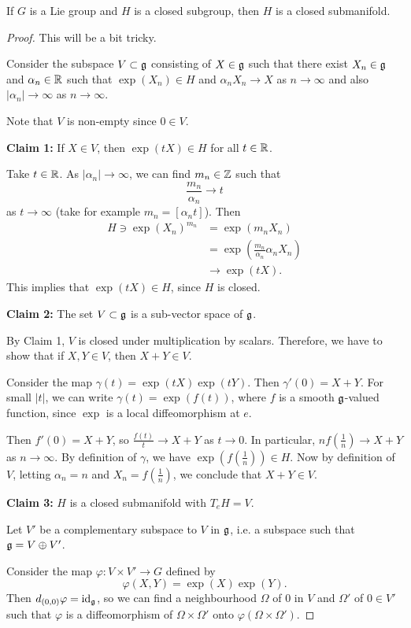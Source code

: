 \documentclass[11pt, english]{article}
\begin{document}
\begin{thm}
\label{thmclosedlie}
If $G$ is a Lie group and $H$ is a closed subgroup, then $H$ is a closed submanifold.
\end{thm}
\begin{proof}
This will be a bit tricky.

Consider the subspace $V \subset \mathfrak g$ consisting of $X \in \mathfrak g$ such that there exist $X_n \in \mathfrak g$ and $\alpha_n \in \mathbb{R}$ such that $\exp(X_n) \in H$ and $\alpha_n X_n \to X$ as $ n \to \infty$ and also $\lvert \alpha_n \rvert \to \infty$ as $n \to \infty$.

Note that $V$ is non-empty since $0 \in V$.

\textbf{Claim 1:} If $X \in V$, then $\exp(tX) \in H$ for all $t \in \mathbb{R}$.

Take $t \in \mathbb{R}$. As $\lvert \alpha_n \rvert \to \infty$, we can find $m_n \in \mathbb{Z}$ such that 
$$
\frac{m_n}{\alpha_n} \to t
$$
as $t \to \infty$ (take for example $m_n=[\alpha_n t ]$). Then
\begin{align*}
H \ni   \exp(X_n)^{m_n} &= \exp(m_n X_n) \\
&= \exp(\frac{m_n}{\alpha_n} \alpha_n X_n) \\
&\to \exp(t X). 
\end{align*}
This implies that $\exp(tX) \in H$, since $H$ is closed.

\textbf{Claim 2:} The set $V \subset \mathfrak g$ is a sub-vector space of $\mathfrak g$.

By Claim 1, $V$ is closed under multiplication by scalars. Therefore, we have to show that if $X,Y \in V$, then $X+Y \in V$. 

Consider the map $\gamma(t)=\exp(tX)\exp(tY)$. Then $\gamma'(0)=X+Y$. For small $\lvert t \rvert$, we can write $\gamma(t)=\exp(f(t))$, where $f$ is a smooth $\mathfrak g$-valued function, since $\exp$ is a local diffeomorphism at $e$. 

Then $f'(0) = X+Y$, so $\frac{f(t)}{t} \to X+Y$ as $t \to 0$. In particular, $nf(\frac{1}{n}) \to X+Y$ as $n \to \infty$. By definition of $\gamma$, we have $\exp(f(\frac 1 n)) \in H$. Now by definition of $V$, letting $\alpha_n=n$ and $X_n = f(\frac 1n)$, we conclude that $X+Y \in V$. 

\textbf{Claim 3:} $H$ is a closed submanifold with $T_e H = V$. 

Let $V'$ be a complementary subspace to $V$ in $\mathfrak g$, i.e. a subspace such that $\mathfrak g = V \oplus V'$. 

Consider the map $\varphi: V \times V' \to G$ defined by
$$
\varphi(X,Y) = \exp(X) \exp(Y).
$$
Then $d_{(0,0)}\varphi = \text{id}_\mathfrak g$, so we can find a neighbourhood $\Omega$ of $0$ in $V$ and $\Omega'$ of $0 \in V'$ such that $\varphi$ is a diffeomorphism of $\Omega \times \Omega'$ onto $\varphi(\Omega \times \Omega')$. 


\end{proof}
\end{document}
